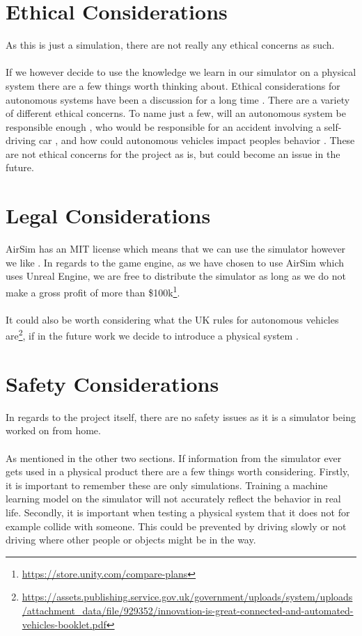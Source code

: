 \section{Ethical Considerations}
As this is just a simulation, there are not really any ethical concerns as such. 
\\~\\
If we however decide to use the knowledge we learn in our simulator on a physical system there are a few things worth thinking about. Ethical considerations for autonomous systems have been a discussion for a long time \cite{ArkinRonaldC2016EaAS, BorensteinJason2019SCaE}. There are a variety of different ethical concerns. To name just a few, will an autonomous system be responsible enough \cite{BorensteinJason2019SCaE}, who would be responsible for an accident involving a self-driving car \cite{Hevelke2015, EthicsIssue}, and how could autonomous vehicles impact peoples behavior \cite{moralComputers}. These are not ethical concerns for the project as is, but could become an issue in the future.

\section{Legal Considerations}
AirSim has an MIT license which means that we can use the simulator however we like \cite{MITLicense}. In regards to the game engine, as we have chosen to use AirSim which uses Unreal Engine, we are free to distribute the simulator as long as we do not make a gross profit of more than \$100k\footnote{\url{https://store.unity.com/compare-plans}}. 
\\~\\
It could also be worth considering what the UK rules for autonomous vehicles are\footnote{\url{https://assets.publishing.service.gov.uk/government/uploads/system/uploads/attachment_data/file/929352/innovation-is-great-connected-and-automated-vehicles-booklet.pdf}}, if in the future work we decide to introduce a physical system \cite{UKAutoRules, UKAutoRulesGov2}. 


\section{Safety Considerations}
In regards to the project itself, there are no safety issues as it is a simulator being worked on from home. 
\\~\\
As mentioned in the other two sections. If information from the simulator ever gets used in a physical product there are a few things worth considering. Firstly, it is important to remember these are only simulations. Training a machine learning model on the simulator will not accurately reflect the behavior in real life. Secondly, it is important when testing a physical system that it does not for example collide with someone. This could be prevented by driving slowly or not driving where other people or objects might be in the way.